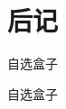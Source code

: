 \documentclass[color=COLORFUL]{textbook-cn}%
\begin{document}
\chapter{后记}
\lipsum
\lipsum



\begin{box6}{自选盒子}
\lipsum[2][1-3]
\end{box6}


\begin{TCBCODE}
\begin{box6}{自选盒子}
\lipsum[2][1-3]
\end{box6}
\end{TCBCODE}



\end{document}
